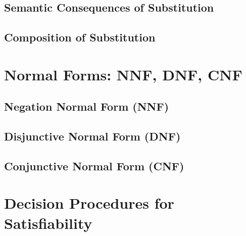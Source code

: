 \subsection{Semantic Consequences of Substitution}

\subsection{Composition of Substitution}

\section{Normal Forms: NNF, DNF, CNF}

\subsection{Negation Normal Form (NNF)}
\subsection{Disjunctive Normal Form (DNF)}
\subsection{Conjunctive Normal Form (CNF)}

\section{Decision Procedures for Satisfiability}

%
%
%

